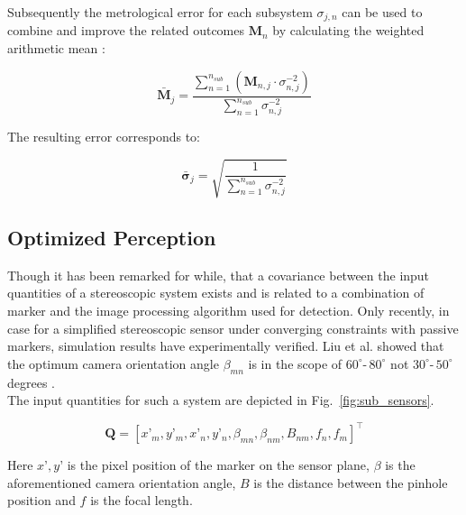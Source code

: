 \documentclass[5p,times,procedia]{elsarticle}
\begin{document}
Subsequently the metrological error for each subsystem $\sigma_{j,n}$ can be used to combine and improve the related outcomes $\mathbf{M}_n$ by calculating the weighted arithmetic mean \cite{Price1972}:

\begin{equation}
	\mathbf{\bar{M}}_{j} = \frac{\sum_{n=1}^{n_{sub}} \left( \mathbf{M}_{n,j} \cdot \sigma_{n,j}^{-2} \right)}{\sum_{n=1}^{n_{sub}} \sigma_{n,j}^{-2}}
\end{equation}

The resulting error corresponds to:

\begin{equation}
	\mathbf{\bar{\sigma}}_{j} = \sqrt{ \frac{1}{\sum_{n=1}^{n_{sub}} \sigma_{n,j}^{-2}} }
\end{equation}


\subsection{Optimized Perception}
Though it has been remarked for while\cite{Di_Leo_2011}, that a covariance between the input quantities of a stereoscopic system exists and is related to a combination of marker and the image processing algorithm used for detection. Only recently, in case for a simplified stereoscopic sensor under converging constraints with passive markers, simulation results have experimentally verified. Liu et al. showed that the optimum camera orientation angle $\beta_{mn}$ is in the scope of $60^{\circ} \text{-}\, 80^{\circ}$ \cite{Liu_2021} not $30^{\circ} \text{-}\, 50^{\circ}$ degrees \cite{Yang2018,Fooladgar2013,Sankowski2017}.\\

The input quantities for such a system are depicted in Fig.~\ref{fig:sub_sensors}.

\begin{equation*}
	\mathbf{Q}= \left[x’_m, y’_m, x’_n, y’_n, \beta_{mn}, \beta_{nm}, B_{nm}, f_{n},f_{m}\right]^{\top}
\end{equation*}

 Here $x’, y’$ is the pixel position of the marker on the sensor plane, $\beta$ is the aforementioned camera orientation angle, $B$ is the distance between the pinhole position and $f$ is the focal length. \\
 
\end{document}
